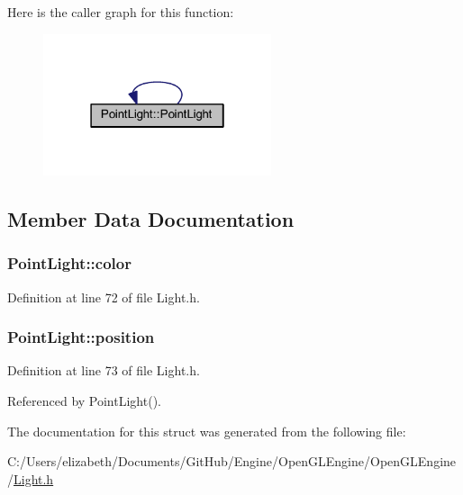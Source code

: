 Here is the caller graph for this function\+:\nopagebreak
\begin{figure}[H]
\begin{center}
\leavevmode
\includegraphics[width=190pt]{struct_point_light_a0f855fe2861bb2372accfc6b93889067_icgraph}
\end{center}
\end{figure}




\subsection{Member Data Documentation}
\subsubsection[{\texorpdfstring{color}{color}}]{ Point\+Light\+::color}\hypertarget{struct_point_light_ab5b56bbc015365ca09c09b564dbeb7f2}{}\label{struct_point_light_ab5b56bbc015365ca09c09b564dbeb7f2}


Definition at line 72 of file Light.\+h.

\subsubsection[{\texorpdfstring{position}{position}}]{ Point\+Light\+::position}\hypertarget{struct_point_light_a5dcffe608a4724ce024a3a3bc96c7585}{}\label{struct_point_light_a5dcffe608a4724ce024a3a3bc96c7585}


Definition at line 73 of file Light.\+h.



Referenced by Point\+Light().



The documentation for this struct was generated from the following file\+:\begin{DoxyCompactItemize}
\item 
C\+:/\+Users/elizabeth/\+Documents/\+Git\+Hub/\+Engine/\+Open\+G\+L\+Engine/\+Open\+G\+L\+Engine/\hyperlink{_light_8h}{Light.\+h}\end{DoxyCompactItemize}
